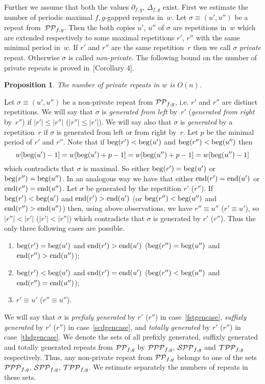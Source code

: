 \documentclass{article}
\newtheorem{proposition}{Proposition}
\begin{document}
Further we assume that both the values $\partial_{f, g}$, $\Delta_{f, g}$ exist.
First we estimate the number of periodic maximal $f,g$-gapped repeats in~$w$. 
Let $\sigma\equiv (u', u'')$ be a repeat from~${\cal PP}_{f,g}$.  Then the both 
copies $u'$, $u''$ of $\sigma$ are repetitions in~$w$ which are extended 
respectively to some maximal repetitions $r'$, $r''$ with the same minimal
period in~$w$. If $r'$ and $r''$ are the same repetition~$r$ then we call 
$\sigma$ {\it private} repeat. Otherwise $\sigma$ is called {\it non-private}.
The following bound on the number of private repeats is proved in~\cite{forJDA}[Corollary 4].
\begin{proposition}
The number of private repeats in $w$ is $O(n)$.
\label{onprivate}
\end{proposition}
Let $\sigma\equiv (u', u'')$ be a non-private repeat from ${\cal PP}_{f,g}$,
i.e. $r'$ and $r''$ are distinct repetitions. We will say that $\sigma$ is
{\it generated from left} by~$r'$ ({\it generated from right} by~$r''$) if
$|r'|\le |r''|$ ($|r''|\le |r'|$). We will say also that $\sigma$ is
{\it generated} by a repetition~$r$ if $\sigma$ is generated from left
or from right by~$r$. Let $p$ be the minimal period of $r'$ and $r''$.
Note that if ${\rm beg} (r')<{\rm beg} (u')$ and ${\rm beg} (r'')<{\rm beg} (u'')$
then 
$$
w[{\rm beg} (u')-1]=w[{\rm beg} (u')+p-1]=w[{\rm beg} (u'')+p-1]=w[{\rm beg} (u'')-1]
$$
which contradicts that $\sigma$ is maximal. So either ${\rm beg} (r')={\rm beg} (u')$
or ${\rm beg} (r'')={\rm beg} (u'')$. In an analogous way we have that either 
${\rm end} (r')={\rm end} (u')$ or ${\rm end} (r'')={\rm end} (u'')$.
Let $\sigma$ be generated by the repetition $r'$ ($r''$). If ${\rm beg} (r')<{\rm beg} (u')$ 
and ${\rm end} (r')>{\rm end} (u')$ (or ${\rm beg} (r'')<{\rm beg} (u'')$ and ${\rm end} (r'')>
{\rm end} (u'')$) then, using above observations, we have $r''\equiv u''$ ($r'\equiv u'$),
so $|r''|<|r'|$ ($|r'|<|r''|$) which contradicts that $\sigma$ is generated by $r'$ ($r''$).
Thus the only three following cases are possible.
\begin{enumerate}
\item ${\rm beg} (r')={\rm beg} (u')$ and ${\rm end} (r')>{\rm end} (u')$
(${\rm beg} (r'')={\rm beg} (u'')$ and ${\rm end} (r'')>{\rm end} (u'')$);
\label{fstgencase}
\item ${\rm beg} (r')<{\rm beg} (u')$ and ${\rm end} (r')={\rm end} (u')$
(${\rm beg} (r'')<{\rm beg} (u'')$ and ${\rm end} (r'')={\rm end} (u'')$);
\label{scdgencase}
\item $r'\equiv u'$ ($r''\equiv u''$).
\label{thdgencase}
\end{enumerate}
We will say that $\sigma$ is {\it prefixly generated} by $r'$ ($r''$) in case~\ref{fstgencase},
{\it suffixly generated} by $r'$ ($r''$) in case~\ref{scdgencase}, and
{\it totally generated} by $r'$ ($r''$) in case~\ref{thdgencase}. We denote
the sets of all prefixly generated, suffixly generated and totally generated
repeats from ${\cal PP}_{f,g}$ by ${\cal PPP}_{f,g}$, ${\cal SPP}_{f,g}$ and
${\cal TPP}_{f,g}$ respectively. Thus, any non-private repeat from ${\cal PP}_{f,g}$
belongs to one of the sets ${\cal PPP}_{f,g}$, ${\cal SPP}_{f,g}$, ${\cal TPP}_{f,g}$.
We estimate separately the numbers of repeats in these sets.
\end{document}

